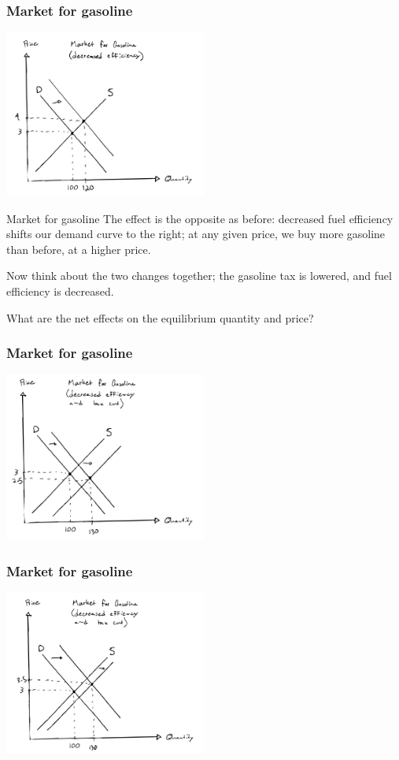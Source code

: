 \documentclass[aspectratio=169]{beamer}
\begin{document}
\begin{frame}
    \frametitle{Market for gasoline}
    \centering
    \includegraphics[width = 0.5\textwidth,keepaspectratio]{decrease_efficiency.png}
\end{frame}

\begin{frame}{Market for gasoline}
    The effect is the opposite as before: decreased fuel efficiency shifts our demand curve to the right; at any given price, we buy more gasoline than before, at a higher price.

    \medskip

    Now think about the two changes together; the gasoline tax is lowered, and fuel efficiency is decreased. 
    
    \medskip

    What are the net effects on the equilibrium quantity and price?
\end{frame}

\begin{frame}
    \frametitle{Market for gasoline}
    \centering
    \includegraphics[width = 0.5\textwidth,keepaspectratio]{both_changes_2a.png}
\end{frame}

\begin{frame}
    \frametitle{Market for gasoline}
    \centering
    \includegraphics[width = 0.5\textwidth,keepaspectratio]{both_changes_2b.png}
\end{frame}
\end{document}
